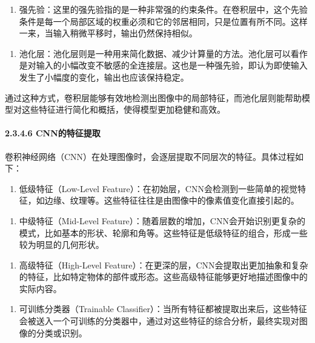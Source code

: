 \begin{enumerate}
\def\labelenumi{\arabic{enumi}.}
\item
  强先验：这里的强先验指的是一种非常强的约束条件。在卷积层中，这个先验条件是每一个局部区域的权重必须和它的邻居相同，只是位置有所不同。这样一来，当输入稍微平移时，输出仍然保持相似。
\end{enumerate}

\begin{enumerate}
\def\labelenumi{\arabic{enumi}.}
\item
  池化层：池化层则是一种用来简化数据、减少计算量的方法。池化层可以看作是对输入的小幅改变不敏感的全连接层。这也是一种强先验，即认为即使输入发生了小幅度的变化，输出也应该保持稳定。
\end{enumerate}

通过这种方式，卷积层能够有效地检测出图像中的局部特征，而池化层则能帮助模型对这些特征进行简化和概括，使得模型更加稳健和高效。

\paragraph{\texorpdfstring{\textbf{2.3.4.6
CNN的特征提取}}{2.3.4.6 CNN的特征提取}}\label{2346-cnnux7684ux7279ux5f81ux63d0ux53d6}

卷积神经网络（CNN）在处理图像时，会逐层提取不同层次的特征。具体过程如下：

\begin{enumerate}
\def\labelenumi{\arabic{enumi}.}
\item
  低级特征（Low-Level
  Feature）：在初始层，CNN会检测到一些简单的视觉特征，如边缘、纹理等。这些特征往往是由图像中的像素值变化直接引起的。
\end{enumerate}

\begin{enumerate}
\def\labelenumi{\arabic{enumi}.}
\item
  中级特征（Mid-Level
  Feature）：随着层数的增加，CNN会开始识别更复杂的模式，比如基本的形状、轮廓和角等。这些特征是低级特征的组合，形成一些较为明显的几何形状。
\end{enumerate}

\begin{enumerate}
\def\labelenumi{\arabic{enumi}.}
\item
  高级特征（High-Level
  Feature）：在更深的层，CNN会提取出更加抽象和复杂的特征，比如特定物体的部件或形态。这些高级特征能够更好地描述图像中的实际内容。
\end{enumerate}

\begin{enumerate}
\def\labelenumi{\arabic{enumi}.}
\item
  可训练分类器（Trainable
  Classifier）：当所有特征都被提取出来后，这些特征会被送入一个可训练的分类器中，通过对这些特征的综合分析，最终实现对图像的分类或识别。
\end{enumerate}

